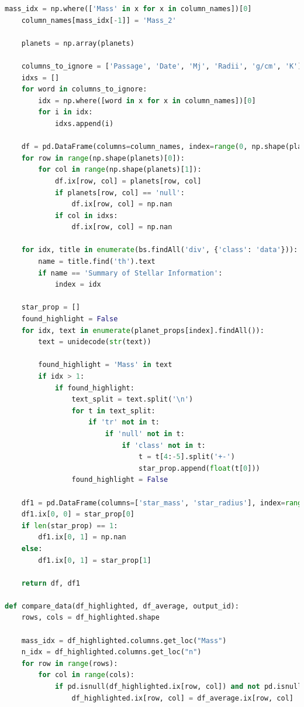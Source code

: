 \documentclass[11pt, oneside]{article}   	%
\begin{document}
\begin{lstlisting}[language=Python, caption={Extracting data from \href{https://exoplanetarchive.ipac.caltech.edu/}{Nasa Exoplanet Archive}}]
    mass_idx = np.where(['Mass' in x for x in column_names])[0]
    column_names[mass_idx[-1]] = 'Mass_2'

    planets = np.array(planets)

    columns_to_ignore = ['Passage', 'Date', 'Mj', 'Radii', 'g/cm', 'K']
    idxs = []
    for word in columns_to_ignore:
        idx = np.where([word in x for x in column_names])[0]
        for i in idx:
            idxs.append(i)

    df = pd.DataFrame(columns=column_names, index=range(0, np.shape(planets)[0]))
    for row in range(np.shape(planets)[0]):
        for col in range(np.shape(planets)[1]):
            df.ix[row, col] = planets[row, col]
            if planets[row, col] == 'null':
                df.ix[row, col] = np.nan
            if col in idxs:
                df.ix[row, col] = np.nan

    for idx, title in enumerate(bs.findAll('div', {'class': 'data'})):
        name = title.find('th').text
        if name == 'Summary of Stellar Information':
            index = idx

    star_prop = []
    found_highlight = False
    for idx, text in enumerate(planet_props[index].findAll()):
        text = unidecode(str(text))

        found_highlight = 'Mass' in text
        if idx > 1:
            if found_highlight:
                text_split = text.split('\n')
                for t in text_split:
                    if 'tr' not in t:
                        if 'null' not in t:
                            if 'class' not in t:
                                t = t[4:-5].split('+-')
                                star_prop.append(float(t[0]))
                found_highlight = False
                
    df1 = pd.DataFrame(columns=['star_mass', 'star_radius'], index=range(0, 1))
    df1.ix[0, 0] = star_prop[0]
    if len(star_prop) == 1:
        df1.ix[0, 1] = np.nan
    else:
        df1.ix[0, 1] = star_prop[1]

    return df, df1

def compare_data(df_highlighted, df_average, output_id):
    rows, cols = df_highlighted.shape

    mass_idx = df_highlighted.columns.get_loc("Mass")
    n_idx = df_highlighted.columns.get_loc("n")
    for row in range(rows):
        for col in range(cols):
            if pd.isnull(df_highlighted.ix[row, col]) and not pd.isnull(df_average.ix[row, col]):
                df_highlighted.ix[row, col] = df_average.ix[row, col]


\end{lstlisting}
\end{document}
